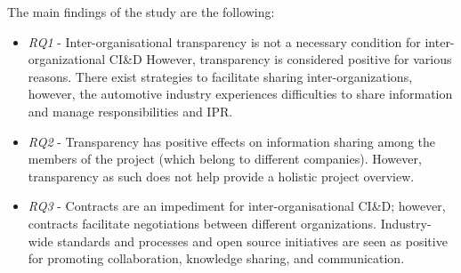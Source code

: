 The main findings of the study are the following:
\begin{itemize}
\item {\em RQ1} - Inter-organisational transparency is not a necessary condition for inter-organizational CI\&D However, transparency is considered positive for various reasons. %
There exist strategies to facilitate sharing inter-organizations, however, the automotive industry experiences difficulties to share information and manage responsibilities and IPR.
\item {\em RQ2} - Transparency has positive effects on information sharing among the members of the project (which belong to different companies). However, transparency as such does not help provide a holistic project overview.
\item {\em RQ3} - Contracts are an impediment for inter-organisational CI\&D; however, contracts facilitate negotiations between different organizations. Industry-wide standards and processes and open source initiatives are seen as positive for promoting collaboration, knowledge sharing, and communication.
\end{itemize}

%



